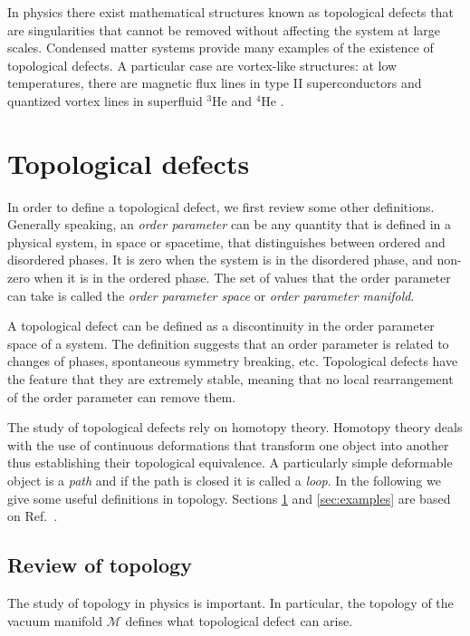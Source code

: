 In physics there exist mathematical structures known as topological defects that are singularities that cannot be removed without affecting the system at large scales.
Condensed matter systems provide many examples of the existence of topological defects. A particular case are vortex-like structures: at low temperatures, there are magnetic flux lines in type II superconductors and quantized vortex lines in superfluid $^{3}$He and $^4$He \cite{Zurek1985,Zurek1993,Zurek1996,bunkov,PhysRevLett.43.214,ancio2015}.

\section{Topological defects}\label{sec:topdef}
In order to define a topological defect, we first review some other definitions. Generally speaking, an \textit{order parameter} can be any quantity that is defined in a physical system, in space or spacetime, that distinguishes between ordered and disordered phases. It is zero when the system is in the disordered phase, and non-zero when it is in the ordered phase. The set of values that the order parameter can take is called the \textit{order parameter space} or \textit{order parameter manifold}.

A topological defect can be defined as a discontinuity in the order pa\-ram\-e\-ter space of a system. The definition suggests that an order parameter is related to changes of phases, spontaneous symmetry breaking, etc. Top\-o\-log\-i\-cal defects have the feature that they are extremely stable, meaning that no local rearrangement of the order parameter can remove them. 

The study of topological defects rely on homotopy theory. Homotopy theory deals with the use of continuous deformations that transform one object into another thus establishing their topological equivalence. A par\-tic\-u\-lar\-ly simple deformable object is a \textit{path} and if the path is closed it is called a \textit{loop}. In the following we give some useful definitions in topology. Sections \ref{sec:topdef} and  \ref{sec:examples} are based on Ref.\ \cite{mermin1979}. 



\subsection{Review of topology}\label{sec:revtop}
The study of topology in physics is important. In particular, the topology of the vacuum manifold $\mathcal{M}$ defines what topological defect can arise. %

